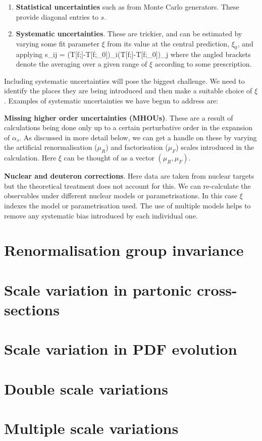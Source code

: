 \begin{enumerate}
    \item \textbf{Statistical uncertainties} such as from Monte Carlo generators. These provide diagonal entries to $s$.
    \item \textbf{Systematic uncertainties}. These are trickier, and can be estimated by varying some fit parameter $\xi$ from its value at the central prediction, $\xi_0$, and applying 
        \beq
        s_{ij} = \langle(T[f;\xi]-T[f;\xi_0])_i(T[f;\xi]-T[f;\xi_0])_j\rangle
        \label{theoryunc}
    \eeq
        where the angled brackets denote the averaging over a given range of $\xi$ according to some prescription.
\end{enumerate}
Including systematic uncertainties will pose the biggest challenge. We need to identify the
places they are being introduced and then make a suitable choice of $\xi$. Examples of
systematic uncertainties we have begun to address are:
    \bi
    \item \textbf{Missing higher order uncertainties (MHOUs)}. These are a result of calculations
      being done only up to a certain perturbative order in the expansion of $\alpha_s$.
      As discussed in more detail below, we can get a handle on these by varying the artificial
      renormalisation ($\mu_R$) and factorisation ($\mu_F$) scales introduced in the calculation.
      Here $\xi$ can be thought of as a vector $(\mu_R, \mu_F)$.
    \item \textbf{Nuclear and deuteron corrections}. Here data are taken from nuclear targets
      but the theoretical treatment does not account for this. We can re-calculate the
      observables under different nuclear models or parametrisations. In this case $\xi$
      indexes the model or parametrisation used. The use of multiple models helps to remove
      any systematic bias introduced by each individual one.
    \ei
\section{Renormalisation group invariance}
\section{Scale variation in partonic cross-sections}
\section{Scale variation in PDF evolution}
\section{Double scale variations}
\section{Multiple scale variations}